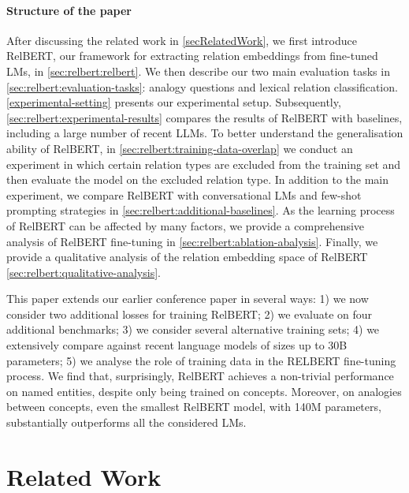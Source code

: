 \documentclass[3p]{elsarticle}
\begin{document}
{\paragraph{Structure of the paper}
After discussing the related work in \autoref{secRelatedWork}, we first introduce RelBERT, our framework for extracting relation embeddings from fine-tuned LMs, in \autoref{sec:relbert:relbert}. We then describe our two main evaluation tasks in \autoref{sec:relbert:evaluation-tasks}: analogy questions and lexical relation classification. \autoref{experimental-setting} presents our experimental setup. Subsequently, \autoref{sec:relbert:experimental-results} compares the results of RelBERT with baselines, including a large number of recent LLMs. To better understand the generalisation ability of RelBERT, in \autoref{sec:relbert:training-data-overlap} we conduct an experiment in which certain relation types are excluded from the training set and then evaluate the model on the excluded relation type. In addition to the main experiment, we compare RelBERT with conversational LMs and few-shot prompting strategies in \autoref{sec:relbert:additional-baselines}. As the learning process of RelBERT can be affected by many factors, we provide a comprehensive analysis of RelBERT fine-tuning in \autoref{sec:relbert:ablation-abalysis}. Finally, we provide a qualitative analysis of the relation embedding space of RelBERT \autoref{sec:relbert:qualitative-analysis}. 

This paper extends our earlier conference paper \cite{ushio-etal-2021-distilling} in several ways: 1) we now consider two additional losses for training RelBERT; 2) we evaluate on four additional benchmarks; 3) we consider several alternative training sets; 4) we extensively compare against recent language models of sizes up to 30B parameters; 5) we analyse the role of training data in the RELBERT fine-tuning process. We find that, surprisingly, RelBERT achieves a non-trivial performance on named entities, despite only being trained on concepts. Moreover, on analogies between concepts, even the smallest RelBERT model, with 140M parameters, substantially outperforms all the considered LMs.


\section{Related Work}\label{secRelatedWork}

}
\end{document}
